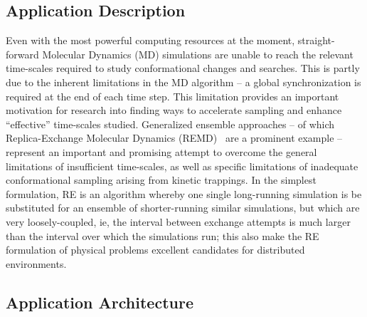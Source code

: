 \documentclass{llncs}
\begin{document}
\upp

\subsection{Application Description}

\upp


Even with the most powerful computing resources at the moment,
straight-forward Molecular Dynamics (MD) simulations are unable to
reach the relevant time-scales required to study conformational
changes and searches. This is partly due to the inherent limitations
in the MD algorithm -- a global synchronization is required at the end
of each time step.  This limitation provides an important motivation
for research into finding ways to accelerate sampling and enhance
``effective'' time-scales studied. Generalized ensemble approaches --
of which Replica-Exchange Molecular Dynamics
(REMD)~\cite{Sugita:1999rm} are a prominent example -- represent an
important and promising attempt to overcome the general limitations of
insufficient time-scales, as well as specific limitations of
inadequate conformational sampling arising from kinetic trappings.  In
the simplest formulation, RE is an algorithm whereby one
single long-running simulation is be substituted for an ensemble of
shorter-running similar simulations, but which are very
loosely-coupled, ie, the interval between exchange attempts is much
larger than the interval over which the simulations run; this also
make the RE formulation of physical problems excellent
candidates for distributed environments.


\upp

\subsection{Application Architecture}

\upp
\end{document}
